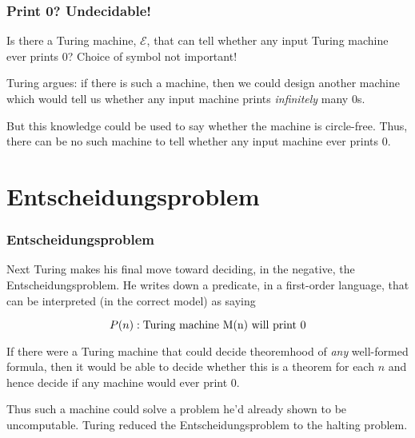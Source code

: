 \documentclass{beamer}
\begin{document}
\begin{frame}
	\frametitle{Print 0? Undecidable!}

	Is there a Turing machine, $\mathcal{E}$, that can tell whether any input Turing machine ever prints 0? Choice of symbol not important!
	
	\vspace{0.3cm}

	Turing argues: if there is such a machine, then we could design another machine which would tell us whether any input machine prints \emph{infinitely} many 0s. 
	
	\vspace{0.3cm}
	
	But this knowledge could be used to say whether the machine is circle-free. Thus, there can be no such machine to tell whether any input machine ever prints 0.
	
\end{frame}

\section{Entscheidungsproblem}
\begin{frame}
	\frametitle{Entscheidungsproblem}

	Next Turing makes his final move toward deciding, in the negative, the Entscheidungsproblem. He writes down a predicate, in a first-order language, that can be interpreted (in the correct model) as saying

	$$P(n): \textnormal{Turing machine M(n) will print 0}$$
	
	If there were a Turing machine that could decide theoremhood of \emph{any} well-formed formula, then it would be able to decide whether this is a theorem for each $n$ and hence decide if any machine would ever print 0. 
	
	\vspace{0.5cm}
	
	Thus such a machine could solve a problem he'd already shown to be uncomputable. Turing reduced the Entscheidungsproblem to the halting problem.

\end{frame}
\end{document}

